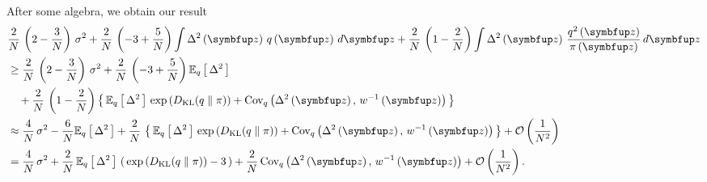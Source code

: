 \begin{proofEnd}
After some algebra, we obtain our result
\begin{align}
  &\frac{2}{N} \,
  \left(2 - \frac{3}{N}\right)
  \, \sigma^2
  +
  \frac{2}{N} \,
  \left(-3 + \frac{5}{N}\right) 
  \int
  \Delta^2\left(\vz\right) \,
  q\left(\vz\right)\,d\vz
  +
  \frac{2}{N} \,
  \left(1 - \frac{2}{N}\right)
  \int
  \Delta^2\left(\vz\right) \,
  \frac{q^2\left(\vz\right)}{\pi\left(\vz\right)}\,
  d\vz
  \\
  &\geq
    \frac{2}{N} \,
    \left(2 - \frac{3}{N}\right)
  \, \sigma^2
  +
  \frac{2}{N} \,
  \left(-3 + \frac{5}{N}\right) 
  \Esub{q}{
    \Delta^2 
  }\nonumber
  \\
  &\quad+
  \frac{2}{N} \,
  \left(1 - \frac{2}{N}\right)
  \left\{\,
  \Esub{q}{
    \Delta^2
  }
  \,
  \exp\left(
    \DKL{q}{\pi}
  \right)
  +
  \text{Cov}_{q}\left(\Delta^2\left(\vz\right),\, w^{-1}\left(\vz\right)\right)
  \,\right\}
  \\
  &\approx
  \frac{4}{N} \, \sigma^2
  -
  \frac{6}{N}
  \Esub{q}{
    \Delta^2 
  }
  +
  \frac{2}{N} \,
  \left\{\,
  \Esub{q}{
    \Delta^2
  }
  \,
  \exp\left(
    \DKL{q}{\pi}
  \right)
  +
  \text{Cov}_{q}\left(\Delta^2\left(\vz\right),\, w^{-1}\left(\vz\right)\right)
  \,\right\}
  +
  \mathcal{O}\left(\frac{1}{N^2}\right)
  \\
  &=
  \frac{4}{N} \, \sigma^2
  +
  \frac{2}{N} \,
  \Esub{q}{
    \Delta^2 
  }
  \,
  \left(\,
  \exp\left(
    \DKL{q}{\pi}
  \right)
  -
  3
  \,\right)
  +
  \frac{2}{N} \,
  \text{Cov}_{q}\left(\Delta^2\left(\vz\right),\, w^{-1}\left(\vz\right)\right)
  +
  \mathcal{O}\left(\frac{1}{N^2}\right).
\end{align}


\end{proofEnd}

